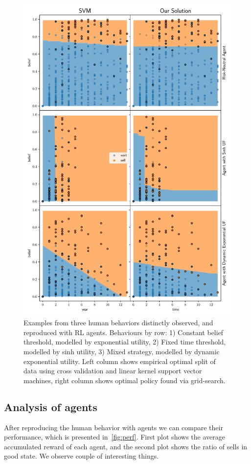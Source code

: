 \begin{figure}[h]
    \centering
    \includegraphics[width=0.99\linewidth]{img/fit}
    \caption{Examples from three human behaviors distinctly observed, and reproduced with RL agents. Behaviours by row: 1) Constant belief threshold, modelled by exponential utility, 2) Fixed time threshold, modelled by sinh utility, 3) Mixed strategy, modelled by dynamic exponential utility. Left column shows empirical optimal split of data using cross validation and linear kernel support vector machines, right column shows optimal policy found via grid-search.}
    \label{fig:svm_vs_value}
\end{figure}

\subsection{Analysis of agents}
After reproducing the human behavior with agents we can compare their performance, which is presented in~\autoref{fig:perf}.
First plot shows the average accumulated reward of each agent, and the second plot shows the ratio of sells in good state.
We observe couple of interesting things.

